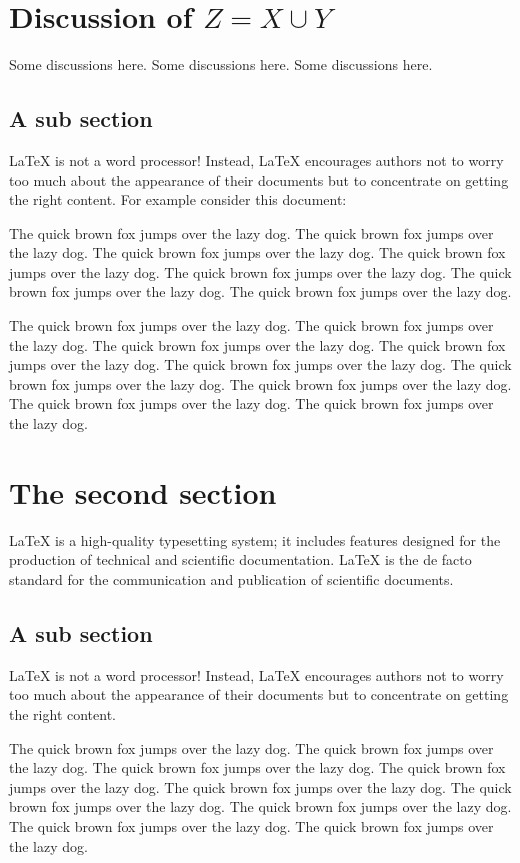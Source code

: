 \documentclass[openany,twoside,12pt]{book}
\theoremstyle{plain}
\numberwithin{equation}{chapter}
\numberwithin{figure}{chapter}
\numberwithin{table}{chapter}
\begin{document}
\section{Discussion of \texorpdfstring{{\boldmath$Z=X \cup Y$}}{Z = X union Y}}
\label{sec:discussion}

Some discussions here. Some discussions here. Some discussions here.

\subsection{A sub section}
LaTeX is not a word processor! Instead, LaTeX encourages authors not to worry too much about the appearance of their documents but to concentrate on getting the right content. For example consider this document:

The quick brown fox jumps over the lazy dog. The quick brown fox jumps over the lazy dog. The quick brown fox jumps over the lazy dog. The quick brown fox jumps over the lazy dog. The quick brown fox jumps over the lazy dog. The quick brown fox jumps over the lazy dog. The quick brown fox jumps over the lazy dog.

The quick brown fox jumps over the lazy dog. The quick brown fox jumps over the lazy dog. The quick brown fox jumps over the lazy dog. The quick brown fox jumps over the lazy dog. The quick brown fox jumps over the lazy dog. The quick brown fox jumps over the lazy dog. The quick brown fox jumps over the lazy dog. The quick brown fox jumps over the lazy dog. The quick brown fox jumps over the lazy dog.


\section{The second section}
LaTeX is a high-quality typesetting system; it includes features designed for the production of technical and scientific documentation. LaTeX is the de facto standard for the communication and publication of scientific documents.

\subsection{A sub section}
LaTeX is not a word processor! Instead, LaTeX encourages authors not to worry too much about the appearance of their documents but to concentrate on getting the right content.

The quick brown fox jumps over the lazy dog. The quick brown fox jumps over the lazy dog. The quick brown fox jumps over the lazy dog. The quick brown fox jumps over the lazy dog. The quick brown fox jumps over the lazy dog. The quick brown fox jumps over the lazy dog. The quick brown fox jumps over the lazy dog. The quick brown fox jumps over the lazy dog. The quick brown fox jumps over the lazy dog.
\end{document}
